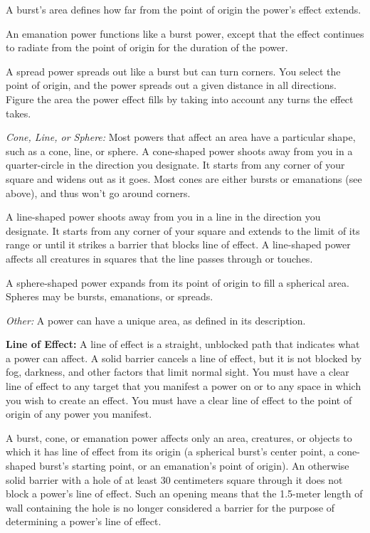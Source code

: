 A burst's area defines how far from the point of origin the power's effect extends.

An emanation power functions like a burst power, except that the effect continues to radiate from the point of origin for the duration of the power.

A spread power spreads out like a burst but can turn corners. You select the point of origin, and the power spreads out a given distance in all directions. Figure the area the power effect fills by taking into account any turns the effect takes.

\textit{Cone, Line, or Sphere:} Most powers that affect an area have a particular shape, such as a cone, line, or sphere. A cone-shaped power shoots away from you in a quarter-circle in the direction you designate. It starts from any corner of your square and widens out as it goes. Most cones are either bursts or emanations (see above), and thus won't go around corners.

A line-shaped power shoots away from you in a line in the direction you designate. It starts from any corner of your square and extends to the limit of its range or until it strikes a barrier that blocks line of effect. A line-shaped power affects all creatures in squares that the line passes through or touches.

A sphere-shaped power expands from its point of origin to fill a spherical area. Spheres may be bursts, emanations, or spreads.

\textit{Other:} A power can have a unique area, as defined in its description.

\textbf{Line of Effect:} A line of effect is a straight, unblocked path that indicates what a power can affect. A solid barrier cancels a line of effect, but it is not blocked by fog, darkness, and other factors that limit normal sight. You must have a clear line of effect to any target that you manifest a power on or to any space in which you wish to create an effect. You must have a clear line of effect to the point of origin of any power you manifest.

A burst, cone, or emanation power affects only an area, creatures, or objects to which it has line of effect from its origin (a spherical burst's center point, a cone-shaped burst's starting point, or an emanation's point of origin). An otherwise solid barrier with a hole of at least 30 centimeters square through it does not block a power's line of effect. Such an opening means that the 1.5-meter length of wall containing the hole is no longer considered a barrier for the purpose of determining a power's line of effect.